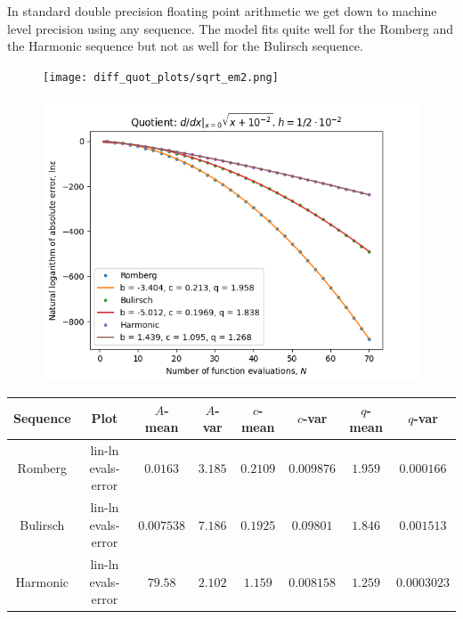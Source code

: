 In standard double precision floating point arithmetic we get down to machine level precision using any sequence. The model fits quite well for the Romberg and the Harmonic sequence but not as well for the Bulirsch sequence.

\begin{figure}[H]
\centering
\begin{minipage}{0.45\textwidth}
\centering
\texttt{[image: diff\_quot\_plots/sqrt\_em2.png]}
\end{minipage}
\begin{minipage}{0.45\textwidth}
\centering
\includegraphics[scale=0.45]{diff_quot_plots/sqrt_em2_hp_trend.png}
\end{minipage}
\end{figure}

\begin{table}[H]
    \centering
    \small
    \begin{tabular}{c|c||c|c|c|c|c|c}
Sequence & Plot & \(A\)-mean & \(A\)-var & \(c\)-mean & \(c\)-var & \(q\)-mean & \(q\)-var\\\hline
Romberg & lin-ln evals-error & \(0.0163\) & \(3.185\) & \(0.2109\) & \(0.009876\) & \(1.959\) & \(0.000166\) \\
Bulirsch & lin-ln evals-error & \(0.007538\) & \(7.186\) & \(0.1925\) & \(0.09801\) & \(1.846\) & \(0.001513\) \\
Harmonic & lin-ln evals-error & \(79.58\) & \(2.102\) & \(1.159\) & \(0.008158\) & \(1.259\) & \(0.0003023\) \\
    \end{tabular}
    \label{tab:my_label}
\end{table}

